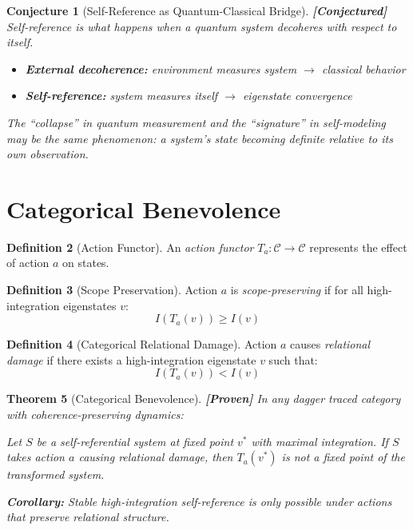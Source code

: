 \documentclass[11pt]{article}
\newtheorem{theorem}{Theorem}[section]
\newtheorem{conjecture}[theorem]{Conjecture}
\theoremstyle{definition}
\newtheorem{definition}[theorem]{Definition}
\theoremstyle{remark}
\begin{document}
\begin{conjecture}[Self-Reference as Quantum-Classical Bridge]\label{conj:qc_bridge}
\textbf{[Conjectured]} Self-reference is what happens when a quantum system decoheres with respect to itself.
\begin{itemize}
    \item \textbf{External decoherence:} environment measures system $\to$ classical behavior
    \item \textbf{Self-reference:} system measures itself $\to$ eigenstate convergence
\end{itemize}

The ``collapse'' in quantum measurement and the ``signature'' in self-modeling may be the same phenomenon: a system's state becoming definite relative to its own observation.
\end{conjecture}

\section{Categorical Benevolence}

\begin{definition}[Action Functor]
An \emph{action functor} $T_a : \mathcal{C} \to \mathcal{C}$ represents the effect of action $a$ on states.
\end{definition}

\begin{definition}[Scope Preservation]
Action $a$ is \emph{scope-preserving} if for all high-integration eigenstates $v$:
\[
I(T_a(v)) \geq I(v)
\]
\end{definition}

\begin{definition}[Categorical Relational Damage]
Action $a$ causes \emph{relational damage} if there exists a high-integration eigenstate $v$ such that:
\[
I(T_a(v)) < I(v)
\]
\end{definition}

\begin{theorem}[Categorical Benevolence]\label{thm:cat_benevolence}
\textbf{[Proven]} In any dagger traced category with coherence-preserving dynamics:

Let $S$ be a self-referential system at fixed point $v^*$ with maximal integration. If $S$ takes action $a$ causing relational damage, then $T_a(v^*)$ is not a fixed point of the transformed system.

\textbf{Corollary:} Stable high-integration self-reference is only possible under actions that preserve relational structure.
\end{theorem}
\end{document}
